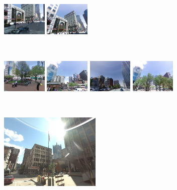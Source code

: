 \begin{figure}[h]
\begin{minipage}{0.75\linewidth}
\begin{minipage}{\linewidth}
              \colorbox{myGreen}{\includegraphics[height=16mm]{imgs/ex2/FVsvm3.jpg}}
              \colorbox{myGreen}{\includegraphics[height=16mm]{imgs/ex2/FVsvm4.jpg}}
          \end{minipage}
          \\
          \begin{minipage}{\linewidth}
              \colorbox{myRed}{\includegraphics[height=16mm]{imgs/ex2/FV1.jpg}}
              \colorbox{myRed}{\includegraphics[height=16mm]{imgs/ex2/FV2.jpg}}
              \colorbox{myRed}{\includegraphics[height=16mm]{imgs/ex2/FV3.jpg}}
              \colorbox{myRed}{\includegraphics[height=16mm]{imgs/ex2/FV4.jpg}}
          \end{minipage} 
      \end{minipage}
      \vspace{3mm}
      \\
      \begin{minipage}{0.34\linewidth}
          \centering
          \vspace{0mm}
          \includegraphics[height=36mm]{imgs/ex3/query.jpg}

\end{minipage}
\end{figure}
